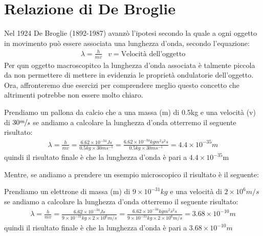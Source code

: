 \section{Relazione di De Broglie}
\label{sec:deBroglie}
Nel 1924 De Broglie (1892-1987) avanzò l'ipotesi secondo la quale a ogni oggetto in movimento può essere associata
una lunghezza d'onda, secondo l'equazione:
\begin{eqnarray}
  \label{eq:deBroglie}
  \lambda = \frac{h}{mv} & v=\text{Velocità dell'oggetto}
\end{eqnarray}
Per qun oggetto macroscopitco la lunghezza  d'onda associata è talmente piccola da non permettere di mettere in
evidenzia le proprietà ondulatorie dell'oggetto.\\
Ora, affronteremo due esercizi per comprendere meglio questo concetto che altrimenti potrebbe non essere molto
chiaro.
\begin{ess}
  Prendiamo un pallona da calcio che a una massa (m) di 0.5kg e una velocità (v) di $30\nicefrac{m}{s}$ se andiamo a
  calcolare la lunghezza d'onda otterremo il seguente risultato:
  \begin{eqnarray*}
    \lambda=\frac{h}{mv} = \frac{6.62\times 10^{-34}Js}{0.5kg\times 30m s^{-1}}=\frac{6.62\times 10^{-34}kgm^2s^2s}{0.5kg\times 30m s^{-1}}=4.4\times 10^{-35}m
  \end{eqnarray*}
  quindi il risultato finale è che la lunghezza d'onda è pari a $4.4\times 10^{-35}$m
\end{ess}
Mentre, se andiamo a prendere un esempio microscopico il risultato è il seguente:
\begin{ess}
  Prendiamo un elettrone di massa (m) di $9\times 10^{-31}kg$ e una velocità di $2\times 10^{6}m/s$ se andiamo a
  calcolare la lunghezza d'onda otterremo il seguente risultato:
  \begin{eqnarray*}
    \lambda = \frac{h}{mv} = \frac{6.62\times 10^{-34}Js}{9\times 10^{-31}kg\times 2\times 10^{6}m/s}=\frac{6.62\times 10^{-34}kgm^2s^2s}{9\times 10^{-31}kg\times 2\times 10^{6}m/s}=3.68\times 10^{-10}m
  \end{eqnarray*}
  quindi il risultato finale è che la lunghezza d'onda è pari a $3.68\times 10^{-10}m$
\end{ess}


